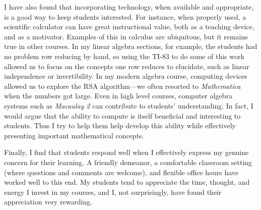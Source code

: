 \documentclass[12pt]{amsart} \usepackage{amssymb}
\begin{document}
I have also found that incorporating technology, when available and
appropriate, is a good way to keep students interested. For instance,
when properly used, a scientific calculator can have great
instructional value, both as a teaching device, and as a motivator.
Examples of this in calculus are ubiquitous, but it remains true in
other courses. In my linear algebra sections, for example, the
students had no problem row reducing by hand, so using the TI-83 to do
some of this work allowed us to focus on the concepts one row reduces
to elucidate, such as linear independence or invertibility. In my
modern algebra course, computing devices allowed us to explore the RSA
algorithm---we often resorted to {\it Mathematica} when the numbers
got large. Even in high level courses, computer algebra systems such
as {\it Macaulay 2} can contribute to students' understanding.  In fact, I
would argue that the ability to compute is itself beneficial and
interesting to students. Thus I try to help them help develop this
ability while effectively presenting important mathematical concepts.

Finally, I find that students respond well when I effectively express
my genuine concern for their learning. A friendly demeanor, a
comfortable classroom setting (where questions and comments are
welcome), and flexible office hours have worked well to this end. My
students tend to appreciate the time, thought, and energy I invest in
my courses, and I, not surprisingly, have found their appreciation
very rewarding.
\end{document}
